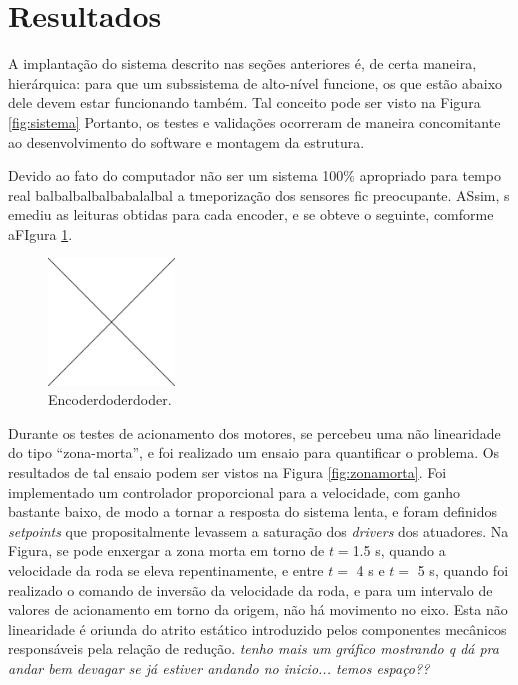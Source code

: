 \section{Resultados}
\label{sec:resultados}

A implantação do sistema descrito nas seções anteriores é, de certa maneira, hierárquica: para que um subssistema de alto-nível funcione, os que estão abaixo dele devem estar funcionando também. Tal conceito pode ser visto na Figura \ref{fig:sistema} Portanto, os testes e validações ocorreram de maneira concomitante ao desenvolvimento do software e montagem da estrutura.

Devido ao fato do computador não ser um sistema 100\% apropriado para tempo real balbalbalbalbabalalbal a tmeporização dos sensores fic preocupante. ASsim, s emediu as leituras obtidas para cada encoder, e se obteve o seguinte, comforme  aFIgura \ref{fig:pos_encoder}.

\begin{figure}[h]
  \centering
  \includegraphics[width = 0.3\textwidth]{imagens/edc}
  \caption{Encoderdoderdoder.}
  \label{fig:pos_encoder}
\end{figure}


Durante os testes de acionamento dos motores, se percebeu uma não linearidade do tipo ``zona-morta'', e foi realizado um ensaio para quantificar o problema. Os resultados de tal ensaio podem ser vistos na Figura \ref{fig:zonamorta}. Foi implementado um controlador proporcional para a velocidade, com ganho bastante baixo, de modo a tornar a resposta do sistema lenta, e foram definidos \emph{setpoints} que propositalmente levassem a saturação dos \textit{drivers} dos atuadores. Na Figura, se pode enxergar a zona morta em torno de $t=$1.5 s, quando a velocidade da roda se eleva repentinamente, e entre $t=$ 4 s e $t=$ 5 s, quando foi realizado o comando de inversão da velocidade da roda, e para um intervalo de valores de acionamento em torno da origem, não há movimento no eixo. Esta não linearidade é oriunda do atrito estático introduzido pelos componentes mecânicos responsáveis pela relação de redução. \textit{tenho mais um gráfico mostrando q dá pra andar bem devagar se já estiver andando no inicio... temos espaço??}


